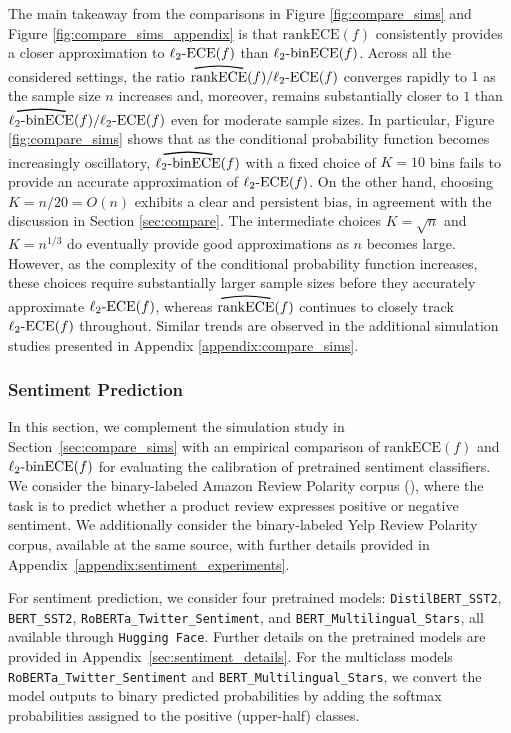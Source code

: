 \documentclass[11pt]{article}
\numberwithin{equation}{section}
\theoremstyle{definition}
\newcommand{\myoverline}[2][3.5em]{%
  \overset{%
    \tikz[baseline=-0.1ex]{
      \draw[line width=0.75pt]
        (0,0) .. controls (#1/2,0.5ex) .. (#1,0);
    }%
  }{#2}%
}
\newcommand{\ECE}{\mathrm{ECE}}
\newcommand{\lECE}{\ell_2\textnormal{-}\ECE}
\newcommand{\binECE}{\mathrm{binECE}}
\newcommand{\lbinECE}{\ell_2\textnormal{-}\binECE}
\newcommand{\binhatECE}{\myoverline{\lbinECE}}
\newcommand{\rankECE}{\mathrm{rankECE}}
\newcommand{\hatrankECE}{\myoverline{\rankECE}}
\begin{document}
The main takeaway from the comparisons in Figure \ref{fig:compare_sims} and Figure \ref{fig:compare_sims_appendix} is that $\rankECE(f)$ consistently provides a closer approximation to $\lECE(f)$ than $\lbinECE(f)$. Across all the considered settings, the ratio $\hatrankECE(f)/\lECE(f)$ converges rapidly to $1$ as the sample size $n$ increases and, moreover, remains substantially closer to $1$ than $\binhatECE(f)/\lECE(f)$ even for moderate sample sizes. In particular, Figure \ref{fig:compare_sims} shows that as the conditional probability function becomes increasingly oscillatory, $\binhatECE(f)$ with a fixed choice of $K=10$ bins fails to provide an accurate approximation of $\lECE(f)$. On the other hand, choosing $K=n/20 = O(n)$ exhibits a clear and persistent bias, in agreement with the discussion in Section \ref{sec:compare}. The intermediate choices $K=\sqrt{n}$ and $K=n^{1/3}$ do eventually provide good approximations as $n$ becomes large. However, as the complexity of the conditional probability function increases, these choices require substantially larger sample sizes before they accurately approximate $\lECE(f)$, whereas $\hatrankECE(f)$ continues to closely track $\lECE(f)$ throughout. Similar trends are observed in the additional simulation studies presented in Appendix \ref{appendix:compare_sims}. 


\subsubsection{Sentiment Prediction}\label{sec:sentiment_main}
In this section, we complement the simulation study in Section~\ref{sec:compare_sims} with an empirical comparison of $\rankECE(f)$ and $\lbinECE(f)$ for evaluating the calibration of pretrained sentiment classifiers. We consider the binary-labeled Amazon Review Polarity corpus (\texttt{}), where the task is to predict whether a product review expresses positive or negative sentiment. We additionally consider the binary-labeled Yelp Review Polarity corpus, available at the same source, with further details provided in Appendix~\ref{appendix:sentiment_experiments}.

For sentiment prediction, we consider four pretrained models: \texttt{DistilBERT\_SST2}, \texttt{BERT\_SST2}, \texttt{RoBERTa\_Twitter\_Sentiment}, and \texttt{BERT\_Multilingual\_Stars}, all available through \texttt{Hugging Face}. Further details on the pretrained models are provided in Appendix~\ref{sec:sentiment_details}. For the multiclass models \texttt{RoBERTa\_Twitter\_Sentiment} and \texttt{BERT\_Multilingual\_Stars}, we convert the model outputs to binary predicted probabilities by adding the softmax probabilities assigned to the positive (upper-half) classes. 
\end{document}
